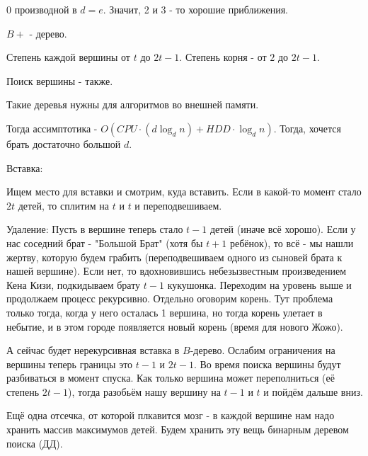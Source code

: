 \documentclass{article}
\begin{document}
0 производной в \(d = e\). Значит, 2 и 3 - то хорошие приближения.

\(B+\) - дерево.

Степень каждой вершины от \(t\) до \(2t - 1\).
Степень корня - от \(2\) до \(2t - 1\).

Поиск вершины - также.

Такие деревья нужны для алгоритмов во внешней памяти. 

Тогда ассимптотика - \(O(CPU \cdot (d \log_d{n}) + HDD \cdot \log_d{n})\).
Тогда, хочется брать достаточно большой \(d\). 

Вставка:

Ищем место для вставки и смотрим, куда вставить. Если в какой-то момент стало \(2t\) детей, то сплитим на \(t\) и \(t\) и переподвешиваем.

Удаление:
Пусть в вершине теперь стало \(t - 1\) детей (иначе всё хорошо). Если у нас соседний брат - "Большой Брат" (хотя бы \(t + 1\) ребёнок), то всё - мы нашли жертву, которую будем грабить (переподвешиваем одного из сыновей брата к нашей вершине). Если нет, то вдохновившись небезызвестным произведением Кена Кизи, подкидываем брату \(t - 1\) кукушонка. Переходим на уровень выше и продолжаем процесс рекурсивно. Отдельно оговорим корень. Тут проблема только тогда, когда у него осталась 1 вершина, но тогда корень улетает в небытие, и в этом городе появляется новый корень (время для нового Жожо). 

А сейчас будет нерекурсивная вставка в \(B\)-дерево.
Ослабим ограничения на вершины теперь границы это \(t - 1\) и \(2t - 1\). Во время поиска вершины будут разбиваться в момент спуска. Как только вершина может переполниться (её степень \(2t - 1\)), тогда разобьём нашу вершину на \(t - 1\) и \(t\) и пойдём дальше вниз.

Ещё одна отсечка, от которой плкавится мозг - в каждой вершине нам надо хранить массив максимумов детей. Будем хранить эту вещь бинарным деревом поиска (ДД).
\end{document}
